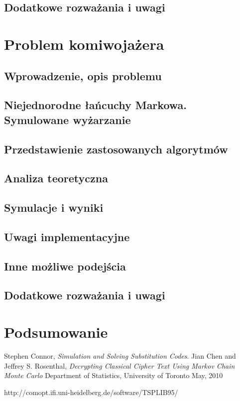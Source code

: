 \documentclass[a4paper]{article}
\begin{document}
\subsection{Dodatkowe rozważania i uwagi}
\section{Problem komiwojażera}
\subsection{Wprowadzenie, opis problemu}
\subsection{Niejednorodne łańcuchy Markowa. Symulowane wyżarzanie} 
\subsection{Przedstawienie zastosowanych algorytmów}
\subsection{Analiza teoretyczna}
\subsection{Symulacje i wyniki}
\subsection{Uwagi implementacyjne}
\subsection{Inne możliwe podejścia}
\subsection{Dodatkowe rozważania i uwagi}
\section{Podsumowanie}


\newpage
\begin{thebibliography}{9}

  Stephen Connor,
  \emph{Simulation and Solving Substitution Codes}.
 Jian Chen and Jeffrey S. Rosenthal,
  \emph{Decrypting Classical Cipher Text Using Markov Chain Monte Carlo}
Department of Statistics, University of Toronto
May, 2010

http://comopt.ifi.uni-heidelberg.de/software/TSPLIB95/
\end{thebibliography}
\end{document}
